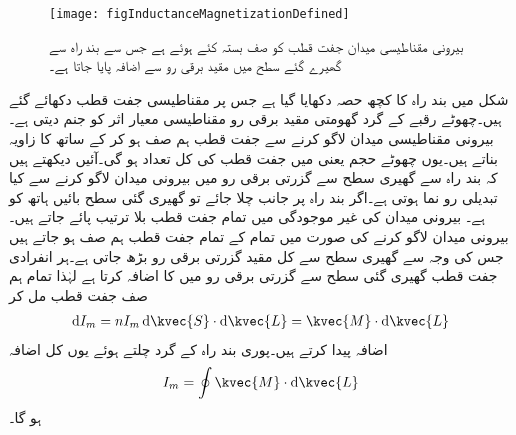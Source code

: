 \begin{figure}
\centering
\texttt{[image: figInductanceMagnetizationDefined]}
\caption{بیرونی مقناطیسی میدان جفت قطب کو صف بستہ کئے ہوئے ہے جس سے بند راہ سے گھیرے گئے سطح میں مقید برقی رو سے اضافہ پایا جاتا ہے۔}
\label{شکل_امالہ_مقناطیسیت_تعریف}
\end{figure}

شکل  میں بند راہ کا کچھ حصہ  دکھایا گیا ہے جس پر مقناطیسی جفت قطب دکھائے گئے ہیں۔چھوٹے رقبے  کے گرد گھومتی مقید برقی رو  مقناطیسی معیار اثر  کو جنم دیتی ہے۔بیرونی مقناطیسی میدان لاگو کرنے سے جفت قطب ہم صف ہو کر  کے ساتھ  کا زاویہ بناتے ہیں۔یوں چھوٹے حجم  یعنی  میں جفت قطب کی کل تعداد  ہو گی۔آئیں دیکھتے ہیں کہ بند راہ سے گھیری سطح سے گزرتی برقی رو میں بیرونی میدان لاگو کرنے سے کیا تبدیلی رو نما ہوتی ہے۔اگر بند راہ پر  جانب چلا جائے تو گھیری گئی سطح بائیں ہاتھ کو ہے۔ بیرونی میدان کی غیر موجودگی میں تمام جفت قطب بلا ترتیب پائے جاتے ہیں۔بیرونی میدان  لاگو کرنے کی صورت میں تمام کے تمام  جفت قطب ہم صف ہو جاتے ہیں جس کی وجہ سے  گھیری سطح سے کل مقید گزرتی برقی رو بڑھ جاتی ہے۔ہر انفرادی جفت قطب گھیری گئی سطح سے گزرتی برقی رو میں  کا اضافہ کرتا ہے لہٰذا تمام ہم صف جفت قطب مل کر
\begin{align}
\dif I_m=n I_m \dif \kvec{S} \cdot \dif \kvec{L}=\kvec{M} \cdot \dif \kvec{L}
\end{align}
اضافہ پیدا کرتے ہیں۔پوری بند راہ کے گرد چلتے ہوئے یوں کل اضافہ
\begin{align}\label{مساوات_امالہ_مقید_برقی_رو_اور_مقناطیسیت}
I_m=\oint \kvec{M} \cdot \dif \kvec{L}
\end{align}
ہو گا۔ 

